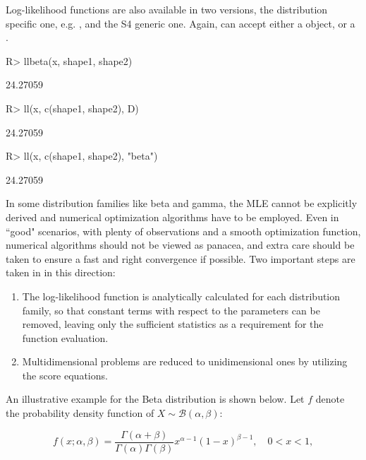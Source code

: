 \documentclass[nojss]{jss}
\newcommand{\fct}[1]{\code{#1()}}
\begin{document}
Log-likelihood functions are also available in two versions, the distribution specific one, e.g. \fct{llbeta}, and the \fct{ll} S4 generic one. Again, \fct{ll} can accept either a  object, or a .

\begin{Schunk}
\begin{Sinput}
R> llbeta(x, shape1, shape2)
\end{Sinput}
\begin{Soutput}
[1] 24.27059
\end{Soutput}
\begin{Sinput}
R> ll(x, c(shape1, shape2), D)
\end{Sinput}
\begin{Soutput}
[1] 24.27059
\end{Soutput}
\begin{Sinput}
R> ll(x, c(shape1, shape2), "beta")
\end{Sinput}
\begin{Soutput}
[1] 24.27059
\end{Soutput}
\end{Schunk}

In some distribution families like beta and gamma, the MLE cannot be explicitly derived and numerical optimization algorithms have to be employed. Even in ``good" scenarios, with plenty of observations and a smooth optimization function, numerical algorithms should not be viewed as panacea, and extra care should be taken to ensure a fast and right convergence if possible. Two important steps are taken in  in this direction:

\begin{enumerate}
  \item The log-likelihood function is analytically calculated for each distribution family, so that constant terms with respect to the parameters can be removed, leaving only the sufficient statistics as a requirement for the function evaluation.
  \item Multidimensional problems are reduced to unidimensional ones by utilizing the score equations.
\end{enumerate}

An illustrative example for the Beta distribution is shown below. Let $f$ denote the probability density function of $X\sim\mathcal{B}(\alpha,\beta)$:

\[
f(x; \alpha, \beta) = \frac{\Gamma(\alpha + \beta)}{\Gamma(\alpha) \Gamma(\beta)}x^{\alpha-1} (1 - x)^{\beta-1}, \quad 0 < x < 1,
\]
\end{document}

